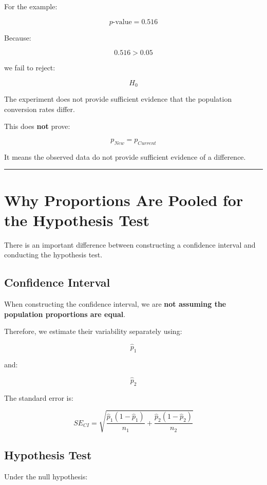 \documentclass[
  letterpaper,
  DIV=11,
  numbers=noendperiod]{scrreprt}
\begin{document}
For the example:

\[
p\text{-value}=0.516
\]

Because:

\[
0.516>0.05
\]

we fail to reject:

\[
H_0
\]

The experiment does not provide sufficient evidence that the population
conversion rates differ.

This does \textbf{not} prove:

\[
p_{New}=p_{Current}
\]

It means the observed data do not provide sufficient evidence of a
difference.

\begin{center}\rule{0.5\linewidth}{0.5pt}\end{center}


\chapter{Why Proportions Are Pooled for the Hypothesis
Test}\label{why-proportions-are-pooled-for-the-hypothesis-test}

There is an important difference between constructing a confidence
interval and conducting the hypothesis test.

\section{Confidence Interval}\label{confidence-interval}

When constructing the confidence interval, we are \textbf{not assuming
the population proportions are equal}.

Therefore, we estimate their variability separately using:

\[
\hat{p}_1
\]

and:

\[
\hat{p}_2
\]

The standard error is:

\[
SE_{CI}
=
\sqrt{
\frac{\hat{p}_1(1-\hat{p}_1)}{n_1}
+
\frac{\hat{p}_2(1-\hat{p}_2)}{n_2}
}
\]

\section{Hypothesis Test}\label{hypothesis-test}

Under the null hypothesis:
\end{document}
